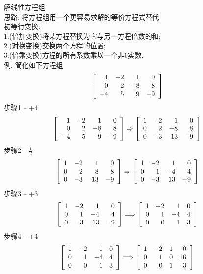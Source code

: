 \documentclass[UTF8,fontset=ubuntu]{ctexart}
\theoremstyle{nonumberplain}
\theoremstyle{break}
\theoremstyle{empty}
\begin{document}
解线性方程组\\
思路: 将方程组用一个更容易求解的等价方程式替代\\
初等行变换:\\
1.(倍加变换)将某方程替换为它与另一方程倍数的和;\\
2.(对换变换)交换两个方程的位置;\\
3.(倍乘变换)方程的所有系数乘以一个非0实数.\\
例. 简化如下方程组
\[\left[\begin{array}{r r r r}
	1 & -2 & 1 & 0\\
	0 & 2 & -8 & 8\\
	-4 & 5 & 9 & -9
\end{array}\right]\]
步骤1 -- +4
\[\left[\begin{array}{r r r r}
    1 & -2 & 1 & 0\\
    0 & 2 & -8 & 8\\
    -4 & 5 & 9 & -9
\end{array}\right] \Rightarrow \left[\begin{array}{r r r r}
    1 & -2 & 1 & 0\\
    0 & 2 & -8 & 8\\
    0 & -3 & 13 & -9
\end{array}\right]\]
步骤2 -- $\frac{1}{2}$
\[\left[\begin{array}{r r r r}
    1 & -2 & 1 & 0\\
    0 & 2 & -8 & 8\\
    0 & -3 & 13 & -9
\end{array}\right] \Rightarrow \left[\begin{array}{r r r r}
    1 & -2 & 1 & 0\\
    0 & 1 & -4 & 4\\
    0 & -3 & 13 & -9
\end{array}\right]\]
步骤3 -- +3
\[\left[\begin{array}{r r r r}
    1 & -2 & 1 & 0\\
    0 & 1 & -4 & 4\\
    0 & -3 & 13 & -9
\end{array}\right] \Longrightarrow \left[\begin{array}{r r r r}
	1 & -2 & 1 & 0\\
	0 & 1 & -4 & 4\\
	0 & 0 & 1 & 3
\end{array}\right]\]
步骤4 -- +4
\[\left[\begin{array}{r r r r}
    1 & -2 & 1 & 0\\
    0 & 1 & -4 & 4\\
    0 & 0 & 1 & 3
\end{array}\right] \Longrightarrow \left[\begin{array}{r r r r}
	1 & -2 & 1 & 0\\
	0 & 1 & 0 & 16\\
	0 & 0 & 1 & 3
\end{array}\right]\]
\end{document}
